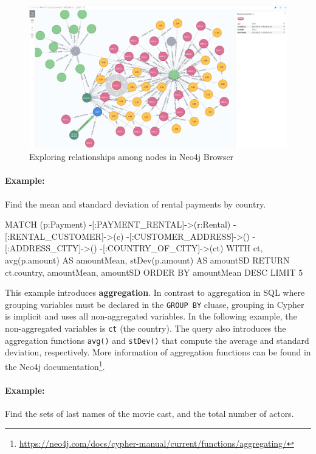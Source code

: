 \begin{figure}
\includegraphics[width=\textwidth]{screen14.png}
\caption{Exploring relationships among nodes in Neo4j Browser}
\label{fig:explorerelationships}
\end{figure}

\paragraph*{Example:} Find the mean and standard deviation of rental payments by country.

\begin{samepage}
\begin{cyphercode}
MATCH (p:Payment) 
        -[:PAYMENT_RENTAL]->(r:Rental) 
        -[:RENTAL_CUSTOMER]->(c) 
        -[:CUSTOMER_ADDRESS]->() 
        -[:ADDRESS_CITY]->()
        -[:COUNTRY_OF_CITY]->(ct)
WITH ct, 
     avg(p.amount) AS amountMean, 
     stDev(p.amount) AS amountSD
RETURN ct.country, amountMean, amountSD
ORDER BY amountMean DESC LIMIT 5
\end{cyphercode}
\end{samepage}

This example introduces \textbf{aggregation}. In contrast to aggregation in SQL where grouping variables must be declared in the \texttt{GROUP BY} cluase, grouping in Cypher is implicit and uses all non-aggregated variables. In the following example, the non-aggregated variables is \texttt{ct} (the country). The query also introduces the aggregation functions \texttt{avg()} and \texttt{stDev()} that compute the average and standard deviation, respectively. More information of aggregation functions can be found in the Neo4j documentation\footnote{\url{https://neo4j.com/docs/cypher-manual/current/functions/aggregating/}}.

\paragraph*{Example:} Find the sets of last names of the movie cast, and the total number of actors.

